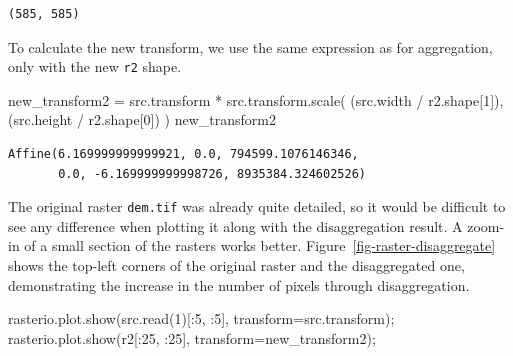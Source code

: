 \documentclass[
  letterpaper,
]{krantz}
\newenvironment{Shaded}{\begin{snugshade}}{\end{snugshade}}
\newcommand{\DecValTok}[1]{\textcolor[rgb]{0.68,0.00,0.00}{#1}}
\newcommand{\NormalTok}[1]{\textcolor[rgb]{0.00,0.23,0.31}{#1}}
\newcommand{\OperatorTok}[1]{\textcolor[rgb]{0.37,0.37,0.37}{#1}}
\begin{document}
\begin{verbatim}
(585, 585)
\end{verbatim}

To calculate the new transform, we use the same expression as for
aggregation, only with the new \texttt{r2} shape.

\begin{Shaded}
\begin{Highlighting}[]
\NormalTok{new\_transform2 }\OperatorTok{=}\NormalTok{ src.transform }\OperatorTok{*}\NormalTok{ src.transform.scale(}
\NormalTok{    (src.width }\OperatorTok{/}\NormalTok{ r2.shape[}\DecValTok{1}\NormalTok{]),}
\NormalTok{    (src.height }\OperatorTok{/}\NormalTok{ r2.shape[}\DecValTok{0}\NormalTok{])}
\NormalTok{)}
\NormalTok{new\_transform2}
\end{Highlighting}
\end{Shaded}

\begin{verbatim}
Affine(6.169999999999921, 0.0, 794599.1076146346,
       0.0, -6.169999999998726, 8935384.324602526)
\end{verbatim}

The original raster \texttt{dem.tif} was already quite detailed, so it
would be difficult to see any difference when plotting it along with the
disaggregation result. A zoom-in of a small section of the rasters works
better. Figure~\ref{fig-raster-disaggregate} shows the top-left corners
of the original raster and the disaggregated one, demonstrating the
increase in the number of pixels through disaggregation.

\begin{Shaded}
\begin{Highlighting}[]
\NormalTok{rasterio.plot.show(src.read(}\DecValTok{1}\NormalTok{)[:}\DecValTok{5}\NormalTok{, :}\DecValTok{5}\NormalTok{], transform}\OperatorTok{=}\NormalTok{src.transform)}\OperatorTok{;}
\NormalTok{rasterio.plot.show(r2[:}\DecValTok{25}\NormalTok{, :}\DecValTok{25}\NormalTok{], transform}\OperatorTok{=}\NormalTok{new\_transform2)}\OperatorTok{;}
\end{Highlighting}
\end{Shaded}
\end{document}
